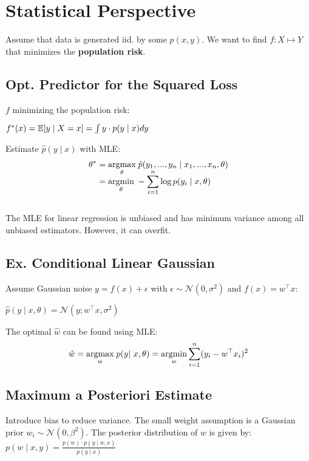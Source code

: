 \section*{Statistical Perspective}

Assume that data is generated iid. by some $p(x, y)$. We want to find $f: X \mapsto Y$ that minimizes the \textbf{population risk}.

\subsection*{Opt. Predictor for the Squared Loss}

$f$ minimizing the population risk:

\qquad $f^*(x) = \mathbb{E}[y \; | \; X = x] = \int y \cdot p(y \; | \; x) dy$

Estimate $\hat{p}(y \; | \; x)$ with MLE:
\begin{align*}
	\theta^* &= \underset{\theta}{\text{argmax}} \; \hat{p}(y_1, ..., y_n \; | \; x_1, ..., x_n, \theta) \\[-10pt]
	&= \underset{\theta}{\text{argmin}} \; - \sum_{i=1}^n \log p(y_i \; | \; x, \theta) 
\end{align*} \\[-15pt]

The MLE for linear regression is unbiased and has minimum variance among all unbiased estimators. However, it can overfit.

\subsection*{Ex. Conditional Linear Gaussian}

Assume Gaussian noise $y = f(x) + \epsilon$ with $\epsilon \sim \mathcal{N}(0, \sigma^2)$ and $f(x) = w^\top x$:

\qquad \qquad $\hat p(y \; | \; x, \theta) = \mathcal{N}(y; w^\top x, \sigma^2)$

The optimal $\hat w$ can be found using MLE:
\qquad \qquad $$\hat w = \argmax{w} \; p(y | x, \theta) =\argmin{w} \sum_{i=1}^n (y_i - w^\top x_i)^2$$

\subsection*{Maximum a Posteriori Estimate}

Introduce bias to reduce variance. The small weight assumption is a Gaussian prior $w_i \sim \mathcal{N}(0, \beta^2)$. The posterior distribution of $w$ is given by:
$p(w \; | \; x, y) = \frac{p(w) \cdot p( y \; | \; w, x)}{p( y \; | \; x)}$


